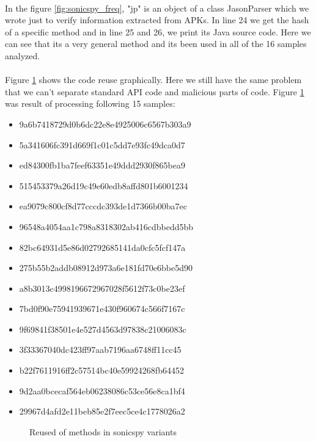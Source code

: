 \documentclass[../main.tex]{subfile}
\begin{document}
		\paragraph{} In the figure \ref{fig:sonicspy_freq}, "jp" is an object of a class JasonParser which we wrote just to verify information extracted from APKs. In line 24 we get the hash of a specific method and in line 25 and 26, we print its Java source code. Here we can see that its a very general method and its been used in all of the 16 samples analyzed.
		
		\paragraph{} Figure \ref{fig:sonicspy_graph} shows the code reuse graphically. Here we still have the same problem that we can't separate standard API code and malicious parts of code. Figure \ref{fig:sonicspy_graph} was result of processing following 15 samples:
		\begin{itemize}
			\item 9a6b7418729d0b6dc22e8e4925006c6567b303a9
			\item 5a341606fc391d669f1c01c5dd7e93fc49dca0d7
			\item ed84300fb1ba7feef63351e49ddd2930f865bea9
			\item 515453379a26d19c49e60edb8affd801b6001234
			\item ea9079c800cf8d77cccdc393de1d7366b00ba7ec
			\item 96548a4054aa1c798a8318302ab416cdbbedd5bb
			\item 82bc64931d5e86d02792685141da0cfc5fcf147a
			\item 275b55b2addb08912d973a6e181fd70e6bbe5d90
			\item a8b3013c4998196672967028f5612f73c0be23ef
			\item 7bd0f90e75941939671e430f960674c566f7167c
			\item 9f69841f38501e4e527d4563d97838c21006083c
			\item 3f33367040dc423ff97aab7196aa6748ff11cc45
			\item b22f7611916ff2c57514bc40e59924268fb64452
			\item 9d2aa0bcecaf564eb06238086c53ce56e8ca1bf4
			\item 29967d4afd2e11beb85e2f7eec5ce4c1778026a2
		\end{itemize}
		
		\begin{figure}[H]
			\centering
			\caption{Reused of methods in sonicspy variants}
			\label{fig:sonicspy_graph}			
		\end{figure}
		
\end{document}

